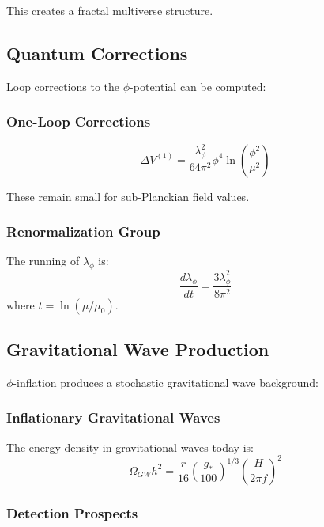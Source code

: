 This creates a fractal multiverse structure.

\subsection{Quantum Corrections}

Loop corrections to the $\phi$-potential can be computed:

\subsubsection{One-Loop Corrections}

\begin{equation}
\Delta V^{(1)} = \frac{\lambda_\phi^2}{64\pi^2} \phi^4 \ln\left(\frac{\phi^2}{\mu^2}\right)
\end{equation}

These remain small for sub-Planckian field values.

\subsubsection{Renormalization Group}

The running of $\lambda_\phi$ is:
\begin{equation}
\frac{d\lambda_\phi}{dt} = \frac{3\lambda_\phi^2}{8\pi^2}
\end{equation}
where $t = \ln(\mu/\mu_0)$.

\subsection{Gravitational Wave Production}

$\phi$-inflation produces a stochastic gravitational wave background:

\subsubsection{Inflationary Gravitational Waves}

The energy density in gravitational waves today is:
\begin{equation}
\Omega_{GW} h^2 = \frac{r}{16} \left(\frac{g_*}{100}\right)^{1/3} \left(\frac{H}{2\pi f}\right)^2
\end{equation}

\subsubsection{Detection Prospects}

